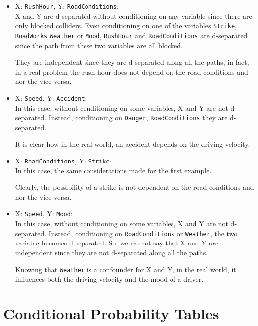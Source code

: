 \documentclass[a4paper,12pt]{article} %
\begin{document}
\begin{itemize}
	\item X: \texttt{RushHour}, Y: \texttt{RoadConditions}:\\
	X and Y are d-separated without conditioning on any variable since there are only blocked colliders. Even conditioning on one of the variables \texttt{Strike}, \texttt{RoadWorks} \texttt{Weather} or \texttt{Mood}, \texttt{RushHour} and \texttt{RoadConditions} are d-separated since the path from these two variables are all blocked.
	
	They are independent since they are d-separated along all the paths, in fact, in a real problem the rush hour does not depend on the road conditions and nor the vice-versa. 
	
	\item X: \texttt{Speed}, Y: \texttt{Accident}:\\
	In this case, without conditioning on some variables, X and Y are not d-separated. Instead, conditioning on \texttt{Danger}, \texttt{RoadConditions} they are d-separated. 
	
	It is clear how in the real world, an accident depends on the driving velocity.  
	
	\item X: \texttt{RoadConditions}, Y: \texttt{Strike}:\\
	In this case, the same considerations made for the first example. 
	
	Clearly, the possibility of a strike is not dependent on the road conditions and nor the vice-versa. 
	
	\item X: \texttt{Speed}, Y: \texttt{Mood}:\\
	In this case, without conditioning on some variables, X and Y are not d-separated. Instead, conditioning on \texttt{RoadConditions} or \texttt{Weather}, the two variable becomes d-separated.
	So, we cannot say that X and Y are independent since they are not d-separated along all the paths.
	
	Knowing that \texttt{Weather} is a confounder for X and Y, in the real world, it influences both the driving velocity and the mood of a driver.

\end{itemize}

\section{Conditional Probability Tables}
\end{document}
